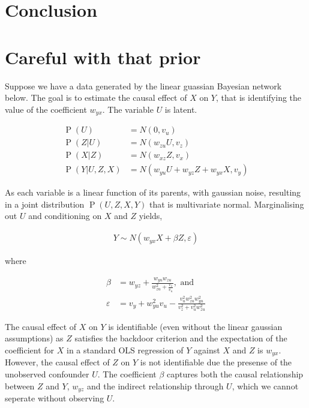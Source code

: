 \documentclass[11pt,a4paper,oneside]{book}
\newcommand{\eqn}[1]{\begin{align}#1\end{align}}
\renewcommand{\P}[1]{\operatorname{P}\left(#1\right)}
\theoremstyle{plain}
\theoremstyle{definition}
\let\epsilon\varepsilon
\begin{document}
\chapter{Conclusion}

\chapter*{Careful with that prior}

Suppose we have a data generated by the linear guassian Bayesian network below. The goal is to estimate the causal effect of $X$ on $Y$, that is identifying the value of the coefficient $w_{yx}$. The variable $U$ is latent. 

\eqn{
\P{U} &= N(0 , v_u) \\
\label{eqn:careful_with_priors}
\P{Z|U} &= N(w_{zu}U , v_z) \\
\P{X|Z} &= N(w_{xz}Z , v_x) \\
\P{Y|U,Z,X} & = N(w_{yu}U +w_{yz}Z + w_{yx}X , v_y)
}

\begin{figure}[h]
\centering
{} 
\caption{ }
\label{fig:careful_with_priors}
\end{figure}

As each variable is a linear function of its parents, with gaussian noise, resulting in a joint distribution $\P{U,Z,X,Y}$ that is multivariate normal. Marginalising out $U$ and conditioning on $X$ and $Z$ yields,

\eqn{
Y \sim N(w_{yx} X + \beta Z, \epsilon) 
}

where

\eqn{
\beta &= w_{yz}+\frac{w_{yu}w_{zu}}{w_{zu}^2+\frac{v_z}{v_u}}, \text{ and}\\
\epsilon &= v_y + w_{yu}^2v_u - \frac{v_u^2 w_{zu}^2 w_{yu}^2 }{v_z^2+v_u^2 w_{zu}^2}
}

The causal effect of $X$ on $Y$ is identifiable (even without the linear gaussian assumptions) as $Z$ satisfies the backdoor criterion and the expectation of the coefficient for $X$ in a standard OLS regression of $Y$ against $X$ and $Z$ is $w_{yx}$. However, the causal effect of $Z$ on $Y$ is not identifiable due the presense of the unobserved confounder $U$. The coefficient $\beta$ captures both the causal relationship between $Z$ and $Y$, $w_{yz}$ and the indirect relationship through $U$, which we cannot seperate without observing $U$. 
\end{document}
